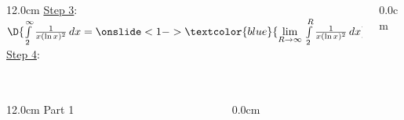 \begin{frame}
\frametitle{}
\scriptsize
\begin{columns}
\begin{column}{12.0cm}
	\underline{Step 3}: $\D{\int \limits_{2}^{\infty} \frac{1}{x(\ln x)^2} \, dx = \onslide<1->{\textcolor{blue}{\lim \limits_{R \to \infty}\, \int \limits_{2}^{R} \frac{1}{x(\ln x)^2} \, dx}}}$ \\ %
\vspace{6.8cm}
\underline{Step 4}: %
\vspace{5.2cm}
\end{column}
\begin{column}{0.0cm}\end{column}
\end{columns}
\end{frame}

\begin{frame}
\frametitle{}
\scriptsize
\begin{columns}
\begin{column}{12.0cm}
Part 1	
\end{column}
\begin{column}{0.0cm}\end{column}
\end{columns}
\end{frame}

